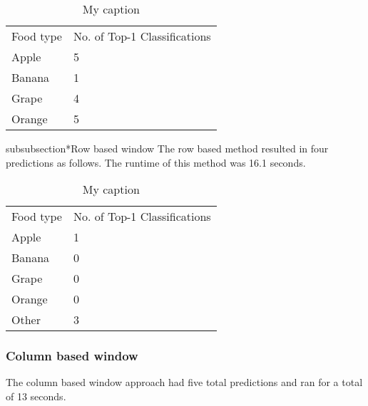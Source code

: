 \begin{table}[]
	\centering
	\caption{My caption}
	\label{my-label}
	\begin{tabular}{ll}
		Food type & No. of Top-1 Classifications \\
		Apple     & 5                      \\
		Banana    & 1                      \\
		Grape     & 4                      \\
		Orange    & 5                     
	\end{tabular}
\end{table}

subsubsection*{Row based window}
The row based method resulted in four predictions as follows. The runtime of
this method was 16.1 seconds.

\begin{table}[]
	\centering
	\caption{My caption}
	\label{my-label}
	\begin{tabular}{ll}
		Food type & No. of Top-1 Classifications \\
		Apple     & 1                      \\
		Banana    & 0                      \\
		Grape     & 0                      \\
		Orange    & 0                      \\
		Other     & 3                     
	\end{tabular}
\end{table}

\tocless\subsubsection{Column based window}
The column based window approach had five total predictions and ran for a total
of 13 seconds.

